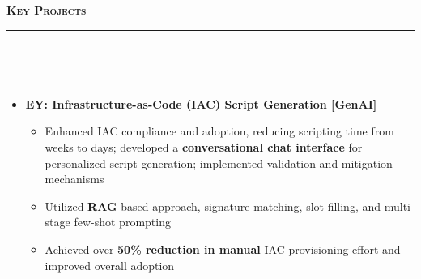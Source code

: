 \documentclass[a4paper,10pt]{article}
\newcommand{\isep}{-2 pt}
\newcommand{\lsep}{-0.5cm}
\newcommand{\resheading}[1]{{\small
        {
            \begin{minipage}
                {0.992\textwidth}\textbf{{\textsc{#1 \vphantom{p\^{E}} }}}
                \\[-0.3cm]
                \hrule
            \end{minipage}
            \\[-0.5cm]
        }
 }}
\begin{document}
\vspace{2pt}
\noindent
\resheading{\textbf{\large Key Projects}}\\[\lsep] 
\vspace{4pt}
\begin{itemize}
\item \textbf{EY: Infrastructure-as-Code (IAC) Script Generation [GenAI]}  
\\[-0.6cm]
    \begin{itemize}\itemsep \isep
        \item Enhanced IAC compliance and adoption, reducing scripting time from weeks to days; developed a \textbf{conversational chat interface} for personalized script generation; implemented validation and mitigation mechanisms
        \item Utilized \textbf{RAG}-based approach, signature matching, slot-filling, and multi-stage few-shot prompting
        \item Achieved over \textbf{50\% reduction in manual} IAC provisioning effort and improved overall adoption
        
    
        

\end{itemize}
\end{itemize}
\end{document}
